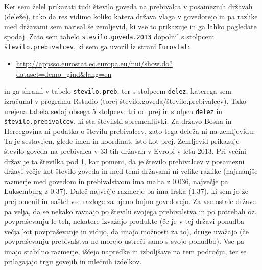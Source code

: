 \documentclass[11pt,a4paper]{article}
\begin{document}
\noindent Ker sem želel prikazati tudi število goveda na prebivalca v posameznih državah (deleže), tako da res vidimo koliko katera država vlaga v govedorejo in pa razlike med državami sem narisal še zemljevid, ki vse to prikazuje in ga lahko pogledate spodaj. Zato sem tabelo \verb|stevilo.goveda.2013| dopolnil s stolpcem \verb|število.prebivalcev|, ki sem ga uvozil iz strani \verb|Eurostat|:
\begin{itemize}
\item \url{http://appsso.eurostat.ec.europa.eu/nui/show.do?dataset=demo_gind&lang=en}
\end{itemize}
in ga shranil v tabelo \verb|stevilo.preb|, ter s stolpcem \verb|delez|, katerega sem izračunal v programu Rstudio (torej število.goveda/število.prebivalcev). Tako urejena tabela sedaj obsega 5 stolpcev: tri od prej in stolpca \verb|delez| in \verb|število.prebivalcev|, ki sta številski spremenljivki. Za državo Bosna in Hercegovina ni podatka o številu prebivalcev, zato tega deleža ni na zemljevidu. Ta je sestavljen, glede imen in koordinat, isto kot prej.
\newline
Zemljevid prikazuje število goveda na prebivalca v 33-tih državah v Evropi v letu 2013. Pri večini držav je ta številka pod 1, kar pomeni, da je število prebivalcev v posamezni državi večje kot število goveda in med temi državami ni velike razlike (najmanjše razmerje med govedom in prebivalstvom ima malta z 0.036, največje pa Luksemburg z 0.37). Daleč največje razmerje pa ima Irska (1.37), ki sem jo že prej omenil in naštel vse razloge za njeno bujno govedorejo. Za vse ostale države pa velja, da se nekako ravnajo po številu svojega prebivalstva in po potrebah oz. povpraševanju le-teh, nekatere  izvažajo produkte (če je v tej državi ponudba večja kot povpraševanje in vidijo, da imajo možnosti za to), druge uvažajo (če povpraševanju prebivalstva ne morejo ustreči samo s svojo ponudbo). Vse pa imajo stabilno razmerje, iščejo napredke in izboljšave na tem področju, ter se prilagajajo trgu govejih in mlečnih izdelkov.

\end{document}

